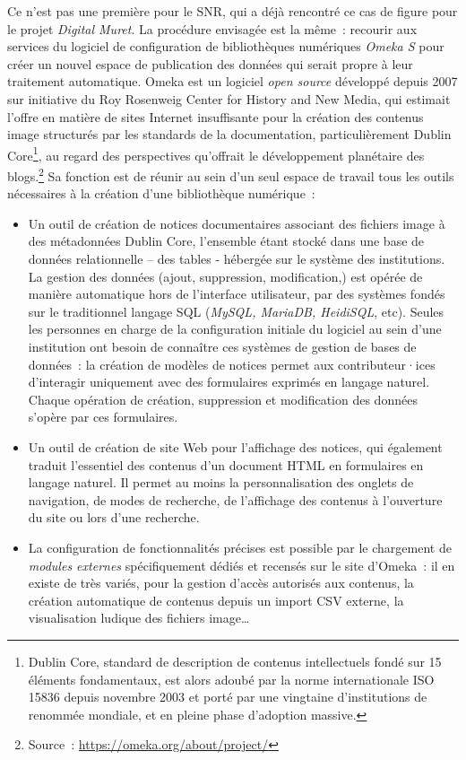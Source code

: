 \documentclass[a4paper,12pt, twoside]{book}
\begin{document}
Ce n’est pas une première pour le SNR, qui a déjà rencontré ce cas de figure pour le projet \textit{Digital Muret}. La procédure envisagée est la même~: recourir aux services du logiciel de configuration de bibliothèques numériques \textit{Omeka S} pour créer un nouvel espace de publication des données qui serait propre à leur traitement automatique. Omeka est un logiciel \textit{open source} développé depuis 2007 sur initiative du Roy Rosenweig Center for History and New Media, qui estimait l’offre en matière de sites Internet insuffisante pour la création des contenus image structurés par les standards de la documentation, particulièrement Dublin Core\footnote{Dublin Core, standard de description de contenus intellectuels fondé sur 15 éléments fondamentaux, est alors adoubé par la norme internationale ISO 15836 depuis novembre 2003 et porté par une vingtaine d’institutions de renommée mondiale, et en pleine phase d’adoption massive.}, au regard des perspectives qu’offrait le développement planétaire des blogs.\footnote{Source~: \url{https://omeka.org/about/project/}} Sa fonction est de réunir au sein d’un seul espace de travail tous les outils nécessaires à la création d’une bibliothèque numérique~:

\begin{itemize}
    \item Un outil de création de notices documentaires associant des fichiers image à des métadonnées Dublin Core, l’ensemble étant stocké dans une base de données relationnelle – des tables - hébergée sur le système des institutions. La gestion des données (ajout, suppression, modification,) est opérée de manière automatique hors de l’interface utilisateur, par des systèmes fondés sur le traditionnel langage SQL (\textit{MySQL, MariaDB, HeidiSQL}, etc). Seules les personnes en charge de la configuration initiale du logiciel au sein d’une institution ont besoin de connaître ces systèmes de gestion de bases de données~: la création de modèles de notices permet aux contributeur·ices d’interagir uniquement avec des formulaires exprimés en langage naturel. Chaque opération de création, suppression et modification des données s’opère par ces formulaires.

    \item Un outil de création de site Web pour l’affichage des notices, qui également traduit l’essentiel des contenus d’un document HTML en formulaires en langage naturel. Il permet au moins la personnalisation des onglets de navigation, de modes de recherche, de l’affichage des contenus à l’ouverture du site ou lors d’une recherche.

    \item La configuration de fonctionnalités précises est possible par le chargement de \textit{modules externes} spécifiquement dédiés et recensés sur le site d’Omeka~: il en existe de très variés, pour la gestion d’accès autorisés aux contenus, la création automatique de contenus depuis un import CSV externe, la visualisation ludique des fichiers image…
\end{itemize}
\end{document}
